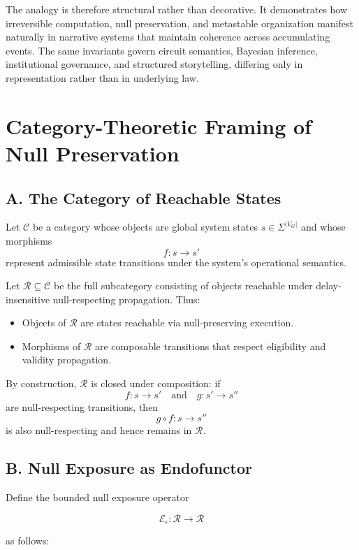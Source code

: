 \documentclass[11pt]{article}
\theoremstyle{remark}
\begin{document}
The analogy is therefore structural rather than decorative. It demonstrates how irreversible computation, null preservation, and metastable organization manifest naturally in narrative systems that maintain coherence across accumulating events. The same invariants govern circuit semantics, Bayesian inference, institutional governance, and structured storytelling, differing only in representation rather than in underlying law.

\section{Category-Theoretic Framing of Null Preservation}
\label{app:category}

\subsection*{A. The Category of Reachable States}

Let $\mathcal{C}$ be a category whose objects are global system states 
$s \in \Sigma^{|V_G|}$ and whose morphisms 
\[
f : s \to s'
\]
represent admissible state transitions under the system’s operational semantics.

Let $\mathcal{R} \subseteq \mathcal{C}$ be the full subcategory consisting of 
objects reachable under delay-insensitive null-respecting propagation. 
Thus:

\begin{itemize}
\item Objects of $\mathcal{R}$ are states reachable via null-preserving execution.
\item Morphisms of $\mathcal{R}$ are composable transitions that respect eligibility and validity propagation.
\end{itemize}

By construction, $\mathcal{R}$ is closed under composition: if 
\[
f : s \to s' \quad \text{and} \quad g : s' \to s''
\]
are null-respecting transitions, then
\[
g \circ f : s \to s''
\]
is also null-respecting and hence remains in $\mathcal{R}$.

\subsection*{B. Null Exposure as Endofunctor}

Define the bounded null exposure operator

\[
\mathcal{E}_\epsilon : \mathcal{R} \to \mathcal{R}
\]

as follows:
\end{document}
